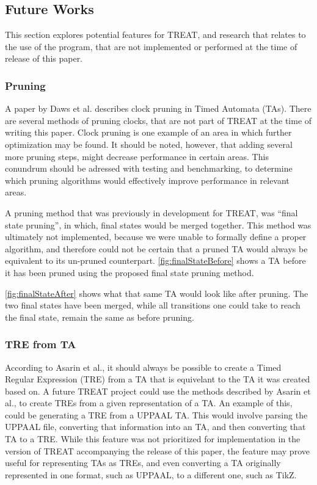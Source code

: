 \subsection{Future Works}\label{subsec:futureWorks}
This section explores potential features for TREAT, and research that relates to the use of the program, that are not implemented or performed at the time of release of this paper.

\subsubsection{Pruning}\label{futureWorks:pruning}
A paper by Daws et al. \cite{Daws1996} describes clock pruning in Timed Automata (TAs). There are several methods of pruning clocks, that are not part of TREAT at the time of writing this paper.
Clock pruning is one example of an area in which further optimization may be found. It should be noted, however, that adding several more pruning steps, might decrease performance in certain areas.
This conundrum should be adressed with testing and benchmarking, to determine which pruning algorithms would effectively improve performance in relevant areas.

\vspace{.5\baselineskip plus 2pt}
A pruning method that was previously in development for TREAT, was ``final state pruning'', in which, final states would be merged together. This method was ultimately not implemented, because we were unable to formally define a proper algorithm, and therefore could not be certain that a pruned TA would always be equivalent to its un-pruned counterpart.
\cref{fig:finalStateBefore} shows a TA before it has been pruned using the proposed final state pruning method.

\vspace{0.75em}

\cref{fig:finalStateAfter} shows what that same TA would look like after pruning. The two final states have been merged, while all transitions one could take to reach the final state, remain the same as before pruning.



\subsubsection{TRE from TA}
According to Asarin et al.\cite{Eugene2001}, it should always be possible to create a Timed Regular Expression (TRE) from a TA that is equivelant to the TA it was created based on.
A future TREAT project could use the methods described by Asarin et al., to create TREs from a given representation of a TA. An example of this, could be generating a TRE from a UPPAAL TA.
This would involve parsing the UPPAAL file, converting that information into an TA, and then converting that TA to a TRE.
While this feature was not prioritized for implementation in the version of TREAT accompanying the release of this paper, the feature may prove useful for representing TAs as TREs, and even converting a TA originally represented in one format, such as UPPAAL, to a different one, such as TikZ.

